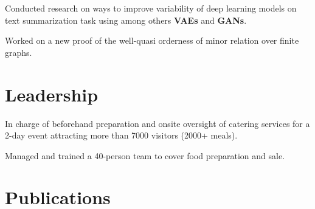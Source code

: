 \documentclass[]{deedy-resume-openfont}
\begin{document}
\begin{minipage}[t]{0.7\textwidth}
\begin{tightemize}
\item Conducted research on ways to improve variability of deep learning models on text summarization task using among others \textbf{VAEs} and \textbf{GANs}.
\end{tightemize}
\sectionsep

\begin{tightemize}
\item Worked on a new proof of the well-quasi orderness of minor relation over finite graphs.
\end{tightemize}
\sectionsep


\section{Leadership}
\begin{tightemize}
\item In charge of beforehand preparation and onsite oversight of catering services for a 2-day event attracting more than 7000 visitors (2000+ meals).
\item Managed and trained a 40-person team to cover food preparation and sale.
\end{tightemize}
\sectionsep


\section{Publications} 
\renewcommand\refname{\vskip -1.5em} %


\nocite{*}

\end{minipage} 
\end{document}
